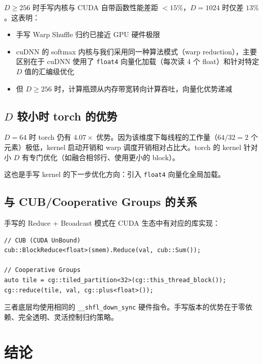 \documentclass[12pt,a4paper]{ctexart}
\begin{document}
$D \geq 256$ 时手写内核与 CUDA 自带函数性能差距 $<15\%$，$D=1024$ 时仅差 $13\%$。这表明：

\begin{itemize}[itemsep=3pt]
    \item 手写 Warp Shuffle 归约已接近 GPU 硬件极限
    \item cuDNN 的 softmax 内核与我们采用同一种算法模式（warp reduction），主要区别在于 cuDNN 使用了 \texttt{float4} 向量化加载（每次读 4 个 float）和针对特定 $D$ 值的汇编级优化
    \item 但 $D \geq 256$ 时，计算瓶颈从内存带宽转向计算吞吐，向量化优势递减
\end{itemize}

\subsection{$D$ 较小时 torch 的优势}

$D=64$ 时 torch 仍有 $4.07\times$ 优势。因为该维度下每线程的工作量（$64/32=2$ 个元素）极低，kernel 启动开销和 warp 调度开销相对占比大。torch 的 kernel 针对小 $D$ 有专门优化（如融合相邻行、使用更小的 block）。

这也是手写 kernel 的下一步优化方向：引入 \texttt{float4} 向量化全局加载。

\subsection{与 CUB/Cooperative Groups 的关系}

手写的 Reduce + Broadcast 模式在 CUDA 生态中有对应的库实现：

\begin{lstlisting}[style=cuda]
// CUB (CUDA UnBound)
cub::BlockReduce<float>(smem).Reduce(val, cub::Sum());

// Cooperative Groups
auto tile = cg::tiled_partition<32>(cg::this_thread_block());
cg::reduce(tile, val, cg::plus<float>());
\end{lstlisting}

三者底层均使用相同的 \texttt{\_\_shfl\_down\_sync} 硬件指令。手写版本的优势在于零依赖、完全透明、灵活控制归约策略。

\section{结论}
\end{document}
